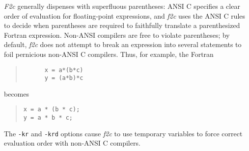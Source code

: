 \documentclass[10pt,a4paper]{article}
\begin{document}
\emph{F2c} generally dispenses with superfluous parentheses: ANSI C specifies a clear order of evaluation for floating-point expressions, and \emph{f2c} uses the ANSI C rules to decide when parentheses are required to faithfully translate a parenthesized Fortran expression. Non-ANSI compilers are free to violate parentheses; by default, \emph{f2c} does not attempt to break an expression into several statements to foil pernicious non-ANSI C compilers. Thus, for example, the Fortran
\begin{quote}
\begin{verbatim}
      x = a*(b*c)
      y = (a*b)*c
\end{verbatim}
\end{quote}
becomes
\begin{quote}
\begin{verbatim}
x = a * (b * c);
y = a * b * c;
\end{verbatim}
\end{quote}
The \verb|-kr| and \verb|-krd| options cause \emph{f2c} to use temporary variables to force correct evaluation order with non-ANSI C compilers.
\end{document}
